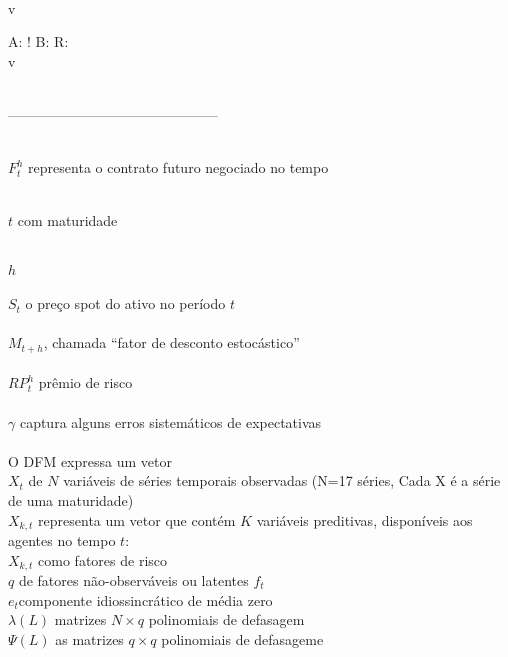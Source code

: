 \documentclass[12pt]{article}
\begin{document}
\\
v

A: !
B: 
R: 
\\v


\\
---------------------------------------------

\\




$F^h_t$ representa o contrato futuro negociado no tempo 

\\$t$ com maturidade 

\\$h$
\\
\\

$S_{t}$ o preço spot do ativo no período $t$
\\
\\

$M_{t+h}$, chamada “fator de desconto estocástico”
\\
\\

 $RP^h_t$ prêmio de risco
\\
\\

$\gamma$ captura alguns erros sistemáticos de expectativas 
\\
\\

O DFM expressa um vetor 
\\

$X_t$ de $N$ variáveis de séries temporais observadas (N=17 séries, Cada X é a série de uma  maturidade)  
\\

$X_{k,t}$ representa um vetor que contém $K$ variáveis preditivas, disponíveis aos agentes no tempo $t$: 
\\

$ X_{k,t}$ como fatores de risco 
\\    



$q$ de fatores não-observáveis ou latentes $f_t$ 
  \\
 
 $e_t$componente idiossincrático de média zero
\\

  $\lambda (L)$ matrizes $N \times q$ polinomiais de defasagem\ 
  \\
  
 $\Psi (L)  $ as matrizes $q \times q$ polinomiais de defasageme  
 \\
 
\end{document}
